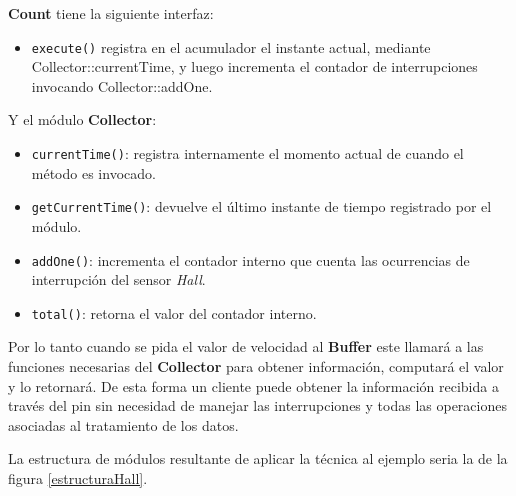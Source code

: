 \textbf{Count} tiene la siguiente interfaz:
\begin{itemize}
    \item \verb|execute()| registra en el acumulador el instante actual, mediante Collector::currentTime, y luego incrementa el contador de interrupciones invocando Collector::addOne.
\end{itemize}

Y el módulo \textbf{Collector}:
\begin{itemize}
    \item \verb|currentTime()|: registra internamente el momento actual de cuando el método es invocado.
    \item \verb|getCurrentTime()|: devuelve el último instante de tiempo registrado por el módulo.
    \item \verb|addOne()|: incrementa el contador interno que cuenta las ocurrencias de interrupción del sensor \textit{Hall}.
    \item \verb|total()|: retorna el valor del contador interno.
\end{itemize}

Por lo tanto cuando se pida el valor de velocidad al \textbf{Buffer} este llamará a las funciones necesarias del \textbf{Collector} para obtener información, computará el valor y lo retornará. De esta forma un cliente puede obtener la información recibida a través del pin sin necesidad de manejar las interrupciones y todas las operaciones asociadas al tratamiento de los datos.

La estructura de módulos resultante de aplicar la técnica al ejemplo seria la de la figura \ref{estructuraHall}.

